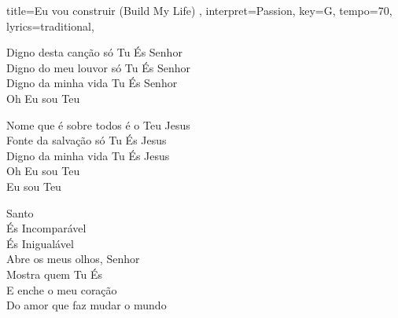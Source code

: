 \documentclass[a4paper, 12pt]{article}
\newcommand{\music}{Eu vou construir (Build My Life) }
\newcommand{\autor}{Passion}
\newcommand{\tom}{G} %
\newcommand{\bpm}{70}
\newcommand{\transpose}{0}
\begin{document}
\pagestyle{empty}



\newcommand{\makesequence}{
  \noindent
  \sequence{I}{}
  \sequence{V1}{}
  \sequence{V2}{}
  \sequence{R1}{}
  \sequence{Gp}{}
  \sequence{V1}{}
  \sequence{V2}{}
  \sequence{R1}{2}
  \sequence{It}{2}
  \sequence{P}{2}
  \sequence{R2}{2}
  \sequence{P}{}
  \sequence{F}{}
}

\begin{song}[transpose=\transpose]{
  title={\music}, 
  interpret={\autor}, 
  key=\tom,
  tempo={\bpm},
  lyrics={traditional},
  }

\begin{multicols}{2}
  \begin{introducao}
       
  \end{introducao}

  \begin{verso}
     Digno desta canção só Tu És Senhor \\
     Digno do meu louvor só Tu És Senhor \\
     Digno da minha vida Tu És Senhor \\
    Oh Eu sou Teu  
  \end{verso}

  \begin{versoDois}
     Nome que é sobre todos é o Teu Jesus \\
     Fonte da salvação só Tu És Jesus \\
     Digno da minha vida Tu És Jesus \\
    Oh Eu sou Teu \\
    Eu sou Teu
  \end{versoDois}

  \begin{refrao}
    Santo \\
    És Incomparável \\
    És Inigualável \\
    Abre os meus olhos, Senhor \\
    Mostra quem Tu És \\
    E enche o meu coração \\
    Do amor que faz mudar o mundo
  \end{refrao}


\end{multicols}
\end{song}
\end{document}
